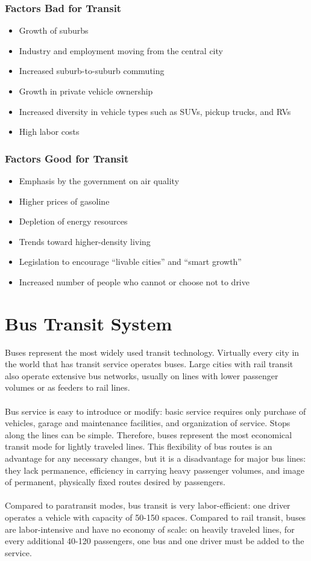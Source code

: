 \subsubsection{Factors Bad for Transit}
\begin{itemize}
	\item Growth of suburbs
	\item Industry and employment moving from the central city
	\item Increased suburb-to-suburb commuting
	\item Growth in private vehicle ownership
	\item Increased diversity in vehicle types such as SUVs, pickup trucks, and RVs
	\item High labor costs
\end{itemize}
%
\subsubsection{Factors Good for Transit}
\begin{itemize}
	\item Emphasis by the government on air quality
	\item Higher prices of gasoline
	\item Depletion of energy resources
	\item Trends toward higher-density living
	\item Legislation to encourage “livable cities” and “smart growth”
	\item Increased number of people who cannot or choose not to drive 
\end{itemize}
%
\section{Bus Transit System}
Buses represent the most widely used transit technology. Virtually every city in the world that has transit service operates buses. Large cities with rail transit also operate extensive bus networks, usually on lines with lower passenger volumes or as feeders to rail lines.\\\\
Bus service is easy to introduce or modify: basic service requires only purchase of vehicles, garage and maintenance facilities, and organization of service. Stops along the lines can be simple. Therefore, buses represent the most economical transit mode for lightly traveled lines. This flexibility of bus routes is an advantage for any necessary changes, but it is a disadvantage for major bus lines: they lack permanence, efficiency in
carrying heavy passenger volumes, and image of permanent, physically fixed routes desired by passengers.\\\\
Compared to paratransit modes, bus transit is very labor-efficient: one driver operates a vehicle with capacity of 50-150 spaces. Compared to rail transit, buses are labor-intensive and have no economy of scale: on heavily traveled lines, for every additional 40-120 passengers, one bus and one driver must be added to the service.
